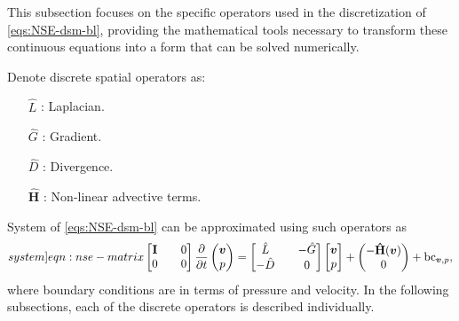 \documentclass{article}
\numberwithin{equation}{section}
\begin{document}
This subsection focuses on the specific operators used in the discretization of \cref{eqs:NSE-dsm-bl}, providing the mathematical tools necessary to transform these continuous equations into a form that can be solved numerically.

Denote discrete spatial operators as:
\begin{enumerate}
	\item[$\hat{L}$]:  Laplacian.
	\item[$\hat{G}$]: Gradient.
	\item[$\hat{D}$]: Divergence.
	\item[$\mathbf{\hat{H}}$]: Non-linear advective terms.
\end{enumerate}
System of \cref{eqs:NSE-dsm-bl} can be approximated using such operators as
\begin{equation}\label[system]{eqn:nse-matrix}
            \begin{bmatrix}
                  \mathbf{I} && 0 \\ 
                  0 && 0
            \end{bmatrix}
            \frac{\partial }{\partial t} 
            \begin{pmatrix}
                  \boldsymbol{v} \\ 
                  p
            \end{pmatrix}
            =
            \begin{bmatrix}
                  \hat{L} && - \hat{G} \\ 
                  -\hat{D} && 0
            \end{bmatrix}
            \begin{bmatrix}
                  \boldsymbol{v} \\
                  p
            \end{bmatrix}
            +
            \begin{pmatrix}
                  -\mathbf{\hat{H}}(\boldsymbol{v})\\
                  0
            \end{pmatrix} + \text{bc}_{\boldsymbol{v},p},
        \end{equation}
where boundary conditions are in terms of pressure and velocity. In the following subsections, each of the discrete operators is described individually. 
\end{document}
